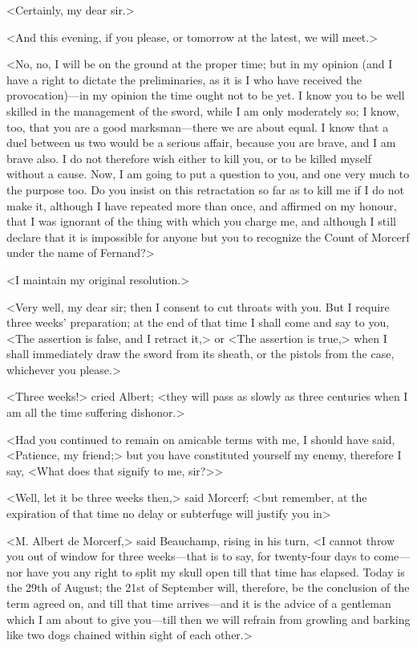  <Certainly, my dear sir.> 

 <And this evening, if you please, or tomorrow at the latest, we will meet.> 

 <No, no, I will be on the ground at the proper time; but in my opinion (and I have a right to dictate the preliminaries, as it is I who have received the provocation)—in my opinion the time ought not to be yet. I know you to be well skilled in the management of the sword, while I am only moderately so; I know, too, that you are a good marksman—there we are about equal. I know that a duel between us two would be a serious affair, because you are brave, and I am brave also. I do not therefore wish either to kill you, or to be killed myself without a cause. Now, I am going to put a question to you, and one very much to the purpose too. Do you insist on this retractation so far as to kill me if I do not make it, although I have repeated more than once, and affirmed on my honour, that I was ignorant of the thing with which you charge me, and although I still declare that it is impossible for anyone but you to recognize the Count of Morcerf under the name of Fernand?> 

 <I maintain my original resolution.> 

 <Very well, my dear sir; then I consent to cut throats with you. But I require three weeks' preparation; at the end of that time I shall come and say to you, <The assertion is false, and I retract it,> or <The assertion is true,> when I shall immediately draw the sword from its sheath, or the pistols from the case, whichever you please.> 

 <Three weeks!> cried Albert; <they will pass as slowly as three centuries when I am all the time suffering dishonor.> 

 <Had you continued to remain on amicable terms with me, I should have said, <Patience, my friend;> but you have constituted yourself my enemy, therefore I say, <What does that signify to me, sir?>> 

 <Well, let it be three weeks then,> said Morcerf; <but remember, at the expiration of that time no delay or subterfuge will justify you in\longdash> 

 <M. Albert de Morcerf,> said Beauchamp, rising in his turn, <I cannot throw you out of window for three weeks—that is to say, for twenty-four days to come—nor have you any right to split my skull open till that time has elapsed. Today is the 29th of August; the 21st of September will, therefore, be the conclusion of the term agreed on, and till that time arrives—and it is the advice of a gentleman which I am about to give you—till then we will refrain from growling and barking like two dogs chained within sight of each other.> 

